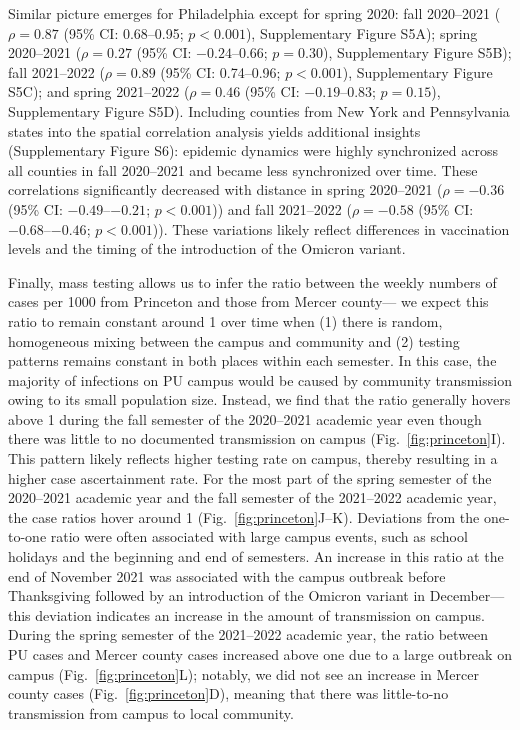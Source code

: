\documentclass[12pt]{article}
\newcommand{\fref}[1]{Fig.~\ref{fig:#1}}
\begin{document}
Similar picture emerges for Philadelphia except for spring 2020: fall 2020--2021 ($\rho = 0.87$ (95\% CI: 0.68--0.95; $p < 0.001$), Supplementary Figure S5A); spring 2020--2021 ($\rho = 0.27$ (95\% CI: $-0.24$--0.66; $p = 0.30$), Supplementary Figure S5B); fall 2021--2022 ($\rho = 0.89$ (95\% CI: 0.74--0.96; $p < 0.001$), Supplementary Figure S5C); 
and spring 2021--2022 ($\rho=0.46$ (95\% CI: $-0.19$--0.83; $p=0.15$), Supplementary Figure S5D).
Including counties from New York and Pennsylvania states into the spatial correlation analysis yields additional insights (Supplementary Figure S6):
epidemic dynamics were highly synchronized across all counties in fall 2020--2021 and became less synchronized over time. 
These correlations significantly decreased with distance in spring 2020--2021 ($\rho = -0.36$ (95\% CI: $-0.49$--$-0.21$; $p < 0.001$)) and fall 2021--2022 ($\rho = -0.58$ (95\% CI: $-0.68$--$-0.46$; $p < 0.001$)).
These variations likely reflect differences in vaccination levels and the timing of the introduction of the Omicron variant.

Finally, mass testing allows us to infer the ratio between the weekly numbers of cases per 1000 from Princeton and those from Mercer county---
we expect this ratio to remain constant around 1 over time when (1) there is random, homogeneous mixing between the campus and community and (2) testing patterns remains constant in both places within each semester. 
In this case, the majority of infections on PU campus would be caused by community transmission owing to its small population size.
Instead, we find that the ratio generally hovers above 1 during the fall semester of the 2020--2021 academic year even though there was little to no documented transmission on campus (\fref{princeton}I).
This pattern likely reflects higher testing rate on campus, thereby resulting in a higher case ascertainment rate.
For the most part of the spring semester of the 2020--2021 academic year and the fall semester of the 2021--2022 academic year, the case ratios hover around 1 (\fref{princeton}J--K).
Deviations from the one-to-one ratio were often associated with large campus events, such as school holidays and the beginning and end of semesters.
An increase in this ratio at the end of November 2021 was associated with the campus outbreak before Thanksgiving followed by an introduction of the Omicron variant in December---this deviation indicates an increase in the amount of transmission on campus.
During the spring semester of the 2021--2022 academic year, the ratio between PU cases and Mercer county cases increased above one due to a large outbreak on campus (\fref{princeton}L);
notably, we did not see an increase in Mercer county cases (\fref{princeton}D), meaning that there was little-to-no transmission from campus to local community.
\end{document}
